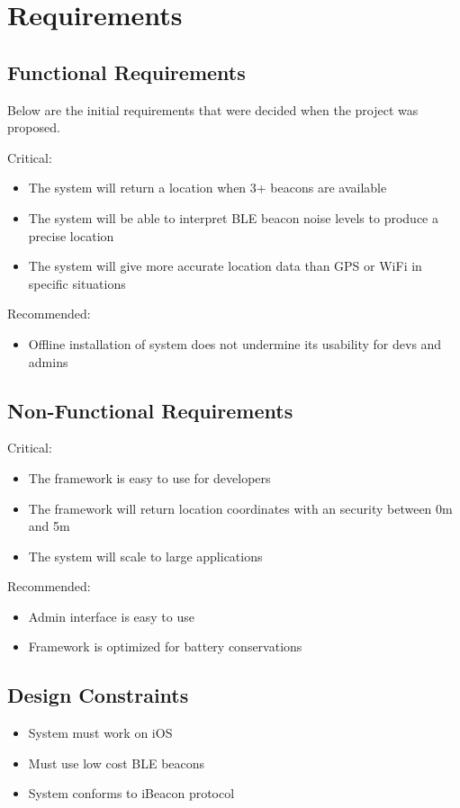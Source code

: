 \chapter{Requirements}

\section{Functional Requirements}
Below are the initial requirements that were decided when the project was proposed.
\newline

Critical:
\begin{itemize}
\item The system will return a location when 3+ beacons are available
\item The system will be able to interpret BLE beacon noise levels to produce a precise location
\item The system will give more accurate location data than GPS or WiFi in specific situations
\end{itemize}
Recommended:
\begin{itemize}
\item Offline installation of system does not undermine its usability for devs and admins
\end{itemize}

\section{Non-Functional Requirements}

Critical:
\begin{itemize}
\item The framework is easy to use for developers
\item The framework will return location coordinates with an security between 0m and 5m
\item The system will scale to large applications
\end{itemize}
Recommended:
\begin{itemize}
\item Admin interface is easy to use
\item Framework is optimized for battery conservations
\end{itemize}

\section{Design Constraints}

\begin{itemize}
\item System must work on iOS
\item Must use low cost BLE beacons
\item System conforms to iBeacon protocol
\end{itemize}
